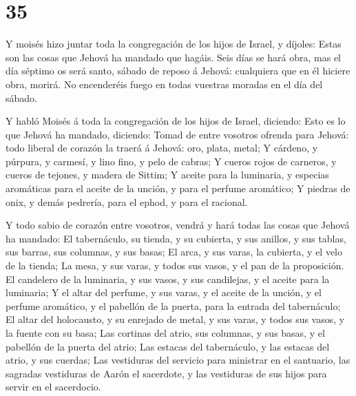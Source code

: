 \hypertarget{section-34}{%
\section{35}\label{section-34}}

 Y moisés hizo juntar toda la congregación de los hijos de
Israel, y díjoles: Estas son las cosas que Jehová ha mandado que hagáis.
 Seis días se hará obra, mas el día séptimo os será santo,
sábado de reposo á Jehová: cualquiera que en él hiciere obra, morirá.
 No encenderéis fuego en todas vuestras moradas en el día
del sábado.

 Y habló Moisés á toda la congregación de los hijos de
Israel, diciendo: Esto es lo que Jehová ha mandado, diciendo:
 Tomad de entre vosotros ofrenda para Jehová: todo liberal
de corazón la traerá á Jehová: oro, plata, metal;  Y
cárdeno, y púrpura, y carmesí, y lino fino, y pelo de cabras;
 Y cueros rojos de carneros, y cueros de tejones, y madera
de Sittim;  Y aceite para la luminaria, y especias
aromáticas para el aceite de la unción, y para el perfume aromático;
 Y piedras de onix, y demás pedrería, para el ephod, y para
el racional.

 Y todo sabio de corazón entre vosotros, vendrá y hará
todas las cosas que Jehová ha mandado:  El tabernáculo, su
tienda, y su cubierta, y sus anillos, y sus tablas, sus barras, sus
columnas, y sus basas;  El arca, y sus varas, la cubierta,
y el velo de la tienda;  La mesa, y sus varas, y todos sus
vasos, y el pan de la proposición.  El candelero de la
luminaria, y sus vasos, y sus candilejas, y el aceite para la luminaria;
 Y el altar del perfume, y sus varas, y el aceite de la
unción, y el perfume aromático, y el pabellón de la puerta, para la
entrada del tabernáculo;  El altar del holocausto, y su
enrejado de metal, y sus varas, y todos sus vasos, y la fuente con su
basa;  Las cortinas del atrio, sus columnas, y sus basas, y
el pabellón de la puerta del atrio;  Las estacas del
tabernáculo, y las estacas del atrio, y sus cuerdas;  Las
vestiduras del servicio para ministrar en el santuario, las sagradas
vestiduras de Aarón el sacerdote, y las vestiduras de sus hijos para
servir en el sacerdocio.

